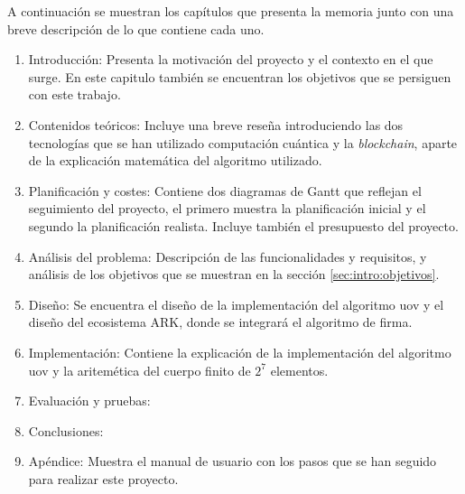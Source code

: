 A continuación se muestran los capítulos que presenta la memoria junto con una breve descripción de lo que contiene cada uno.\\

\begin{enumerate}
	\item Introducción: Presenta la motivación del proyecto y el contexto en el que surge. En este capitulo también se encuentran los objetivos que se persiguen con este trabajo.
	\item Contenidos teóricos: Incluye una breve reseña introduciendo las dos tecnologías que se han utilizado computación cuántica y la \textit{blockchain}, aparte de la explicación matemática del algoritmo utilizado.
	\item Planificación y costes: Contiene dos diagramas de Gantt que reflejan el seguimiento del proyecto, el primero muestra la planificación inicial y el segundo la planificación realista. Incluye también el presupuesto del proyecto.
	\item Análisis del problema: Descripción de las funcionalidades y requisitos, y análisis de los objetivos que se muestran en la sección \ref{sec:intro:objetivos}.
	\item Diseño: Se encuentra el diseño de la implementación del algoritmo \acrshort{uov} y el diseño del ecosistema ARK, donde se integrará el algoritmo de firma.
	\item Implementación: Contiene la explicación de la implementación del algoritmo \acrshort{uov} y la aritemética del cuerpo finito de $2^7$ elementos.
	\item Evaluación y pruebas: 
	\item Conclusiones:
	\item Apéndice: Muestra el manual de usuario con los pasos que se han seguido para realizar este proyecto.
\end{enumerate}




















